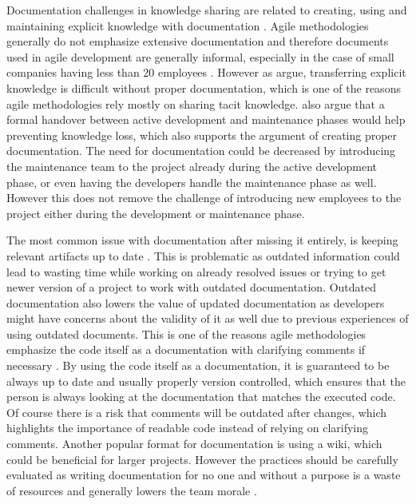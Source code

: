 Documentation challenges in knowledge sharing are related to creating, using and maintaining explicit knowledge with documentation \citep{Ersoy2015}. Agile methodologies
generally do not emphasize extensive documentation and therefore documents used in agile development are generally informal, especially in the case of small companies
having less than 20 employees \citep{Basri2011}. However as \citet{Ersoy2015} argue, transferring explicit knowledge is difficult without proper documentation, which
is one of the reasons agile methodologies rely mostly on sharing tacit knowledge. \citet{Stettina2013} also argue that a formal handover between active development and
maintenance phases would help preventing knowledge loss, which also supports the argument of creating proper documentation. The need for documentation could be 
decreased by introducing the maintenance team to the project already during the active development phase, or even having the developers handle the maintenance phase as well.
However this does not remove the challenge of introducing new employees to the project either during the development or maintenance phase.

The most common issue with documentation after missing it entirely, is keeping relevant artifacts up to date \citep{Ersoy2015}\citep{Stettina2013}. This is problematic
as outdated information could lead to wasting time while working on already resolved issues or trying to get newer version of a project to work with outdated documentation.
Outdated documentation also lowers the value of updated documentation as developers might have concerns about the validity of it as well due to previous experiences of using
outdated documents.
This is one of the reasons agile methodologies emphasize the code itself as a documentation with clarifying comments if necessary \citep{Stettina2013}. By using the code itself 
as a documentation, it is guaranteed to be always up to date and usually properly version controlled, which ensures that the person is always looking at the documentation
that matches the executed code. Of course there is a risk that comments will be outdated after changes, which highlights the importance of readable code instead of relying
on clarifying comments. Another popular format for documentation is using a wiki, which could be beneficial for larger projects. However the practices should be carefully evaluated
as writing documentation for no one and without a purpose is a waste of resources and generally lowers the team morale \citep{Stettina2013}.

